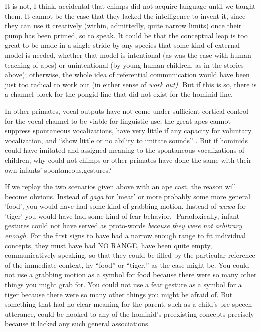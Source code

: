 It is not, I think, accidental that chimps did not acquire language until we taught them. It cannot be the case that they lacked the intelli\-gence to invent it, since they can use it creatively (within, admittedly, quite narrow limits) once their pump has been primed, so to speak. It could be that the conceptual leap is too great to be made in a single stride by any species-that some kind of external model is needed, whether that model is intentional (as was the case with human teaching of apes) or unintentional (by young human children, as in the stories above); otherwise, the whole idea of referential communication would have been just too radical to work out (in either sense of \textit{work} \textit{out}\textit{).} But if this is so, there is a channel block for the pongid line that did not exist for the hominid line.

In other primates, vocal outputs have not come under sufficient cortical control for the vocal channel to be viable for linguistic use; the great apes cannot suppress spontaneous vocalizations, have very little if any capacity for voluntary vocalization, and ``show little or no ability to imitate sounds'' \citep{Dingwall1979}. But if hominids could have imitated and assigned meaning to the spontaneous vocalizations of children, why could not chimps or other primates have done the same with their own infants' spontaneous,gestures?


If we replay the two scenarios given above with an ape cast, the reason will become obvious. Instead of \textit{gaga} for 'meat' or more prob\-ably some more general 'food', you would have had some kind of grabbing motion. Instead of \textit{wawa} for 'tiger' you would have had some kind of fear behavior.- Paradoxically, infant gestures could not have served as proto-words \textit{because} \textit{they} \textit{were} \textit{not} \textit{arbitrary} \textit{enough.} For the first signs to have had a narrow enough range to fit individual concepts, they must have had NO RANGE, have been quite empty, communi\-catively speaking, so that they could be filled by the particular refer\-ence of the immediate context, hy ``food'' or ``tiger,'' as the case might be. You could not use a grabbing motion as a symbol for food because there were so many other things you might grab for. You could not use a fear gesture as a symbol for a tiger because there were so many other things you might be afraid of. But something that had no clear meaning for the parent, such as a child's pre-speech utterance, could be hooked to any of the hominid's preexisting concepts precisely because it lacked any such general associations.

